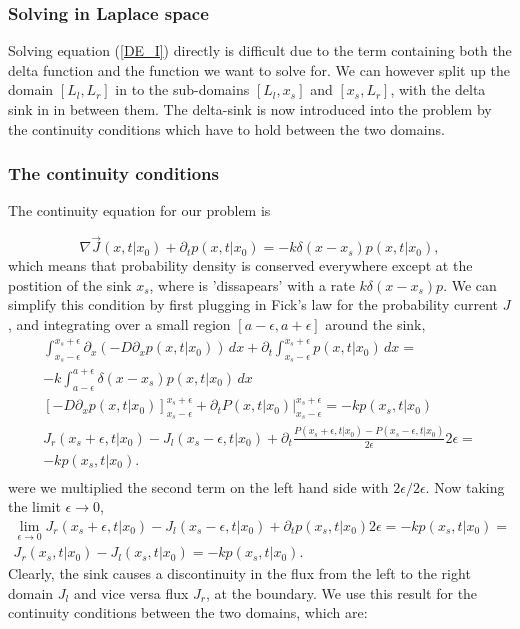 \subsubsection{Solving in Laplace space}

Solving equation (\ref{DE_I}) directly is difficult due to the term containing both the delta function and the function we want to solve for. We can however split up the domain $[L_l,L_r]$ in to the sub-domains $[L_l,x_s]$ and $[x_s,L_r]$, with the delta sink in in between them. The delta-sink is now introduced into the problem by the continuity conditions which have to hold between the two domains. 

\subsubsection{The continuity conditions}

The continuity equation for our problem is

\begin{equation}
 \nabla \vec{J}(x,t|x_0) + \partial_t p(x,t|x_0) = -k \delta( x - x_s ) p(x,t|x_0),
\end{equation}
which means that probability density is conserved everywhere except at the postition of the sink $x_s$, where is 'dissapears' with a rate $k \delta ( x - x_s ) p$. We can simplify this condition by first plugging in Fick's law for the probability current $J$, and integrating over a small region $[a - \epsilon,a + \epsilon]$ around the sink, 
\begin{gather}
\int_{x_s - \epsilon}^{x_s + \epsilon} \partial_x \left( -D \partial_x p(x,t|x_0)  \right) \, dx + \partial_t \int_{x_s - \epsilon}^{x_s + \epsilon} p(x,t|x_0) \, dx = \nonumber \\
-k \int_{a - \epsilon}^{a + \epsilon} \delta( x - x_s ) p(x,t|x_0) \, dx \nonumber \\
\left[ -D \partial_x p(x,t|x_0)  \right]_{x_s - \epsilon}^{x_s + \epsilon} + \partial_t \left. P(x,t|x_0) \right|_{x_s - \epsilon}^{x_s + \epsilon} = -k p(x_s,t|x_0) \nonumber \\
J_r(x_s + \epsilon,t|x_0) - J_l(x_s - \epsilon,t|x_0) + \partial_t \frac{P(x_s + \epsilon,t|x_0) - P(x_s - \epsilon,t|x_0)}{2 \epsilon} 2\epsilon = \nonumber \\ 
-k p(x_s,t|x_0). \nonumber \\
\end{gather}
were we multiplied the second term on the left hand side with $2\epsilon/2\epsilon$. Now taking the limit $\epsilon \rightarrow 0$,
\begin{gather}
 \lim_{\epsilon \to 0} J_r(x_s + \epsilon,t|x_0) - J_l(x_s - \epsilon,t|x_0) + \partial_t p(x_s,t|x_0) 2\epsilon = -k p(x_s,t|x_0) \nonumber = \\
 J_r(x_s,t|x_0) - J_l(x_s,t|x_0) = -k p(x_s,t|x_0).
\end{gather}
Clearly, the sink causes a discontinuity in the flux from the left to the right domain $J_l$ and vice versa flux $J_r$, at the boundary. We use this result for the continuity conditions between the two domains, which are:

